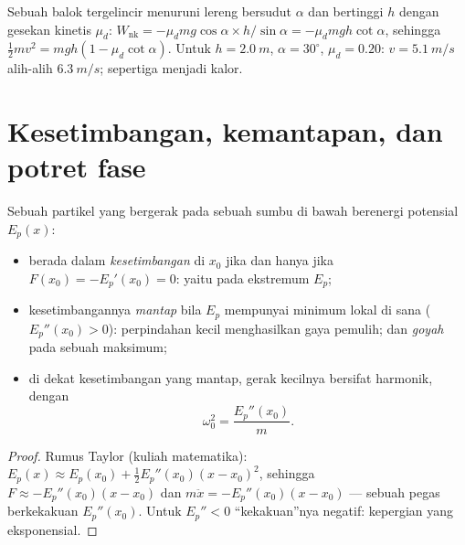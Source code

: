 \begin{example}\label{ex:b1:work-and-energy:friction}
Sebuah balok tergelincir menuruni lereng bersudut $\alpha$ dan
bertinggi $h$ dengan gesekan kinetis $\mu_d$: $W_{\text{nk}} = -\mu_dmg\cos\alpha \times
h/\sin\alpha = -\mu_dmgh\cot\alpha$, sehingga $\tfrac12 mv^2 = mgh(1 - \mu_d\cot\alpha)$.
Untuk $h = \qty{2.0}{m}$, $\alpha = 30^\circ$, $\mu_d = 0.20$: $v =
\qty{5.1}{m/s}$ alih-alih $\qty{6.3}{m/s}$; sepertiga  menjadi kalor.
\end{example}

\section{Kesetimbangan, kemantapan, dan potret fase}

\begin{proposition}\label{prop:b1:work-and-energy:stability}
Sebuah partikel yang bergerak pada sebuah sumbu di bawah  berenergi potensial $E_p(x)$:
\begin{itemize}
  \item berada dalam \emph{kesetimbangan} di $x_0$ jika dan hanya jika
        $F(x_0) = -E_p'(x_0) = 0$: yaitu pada ekstremum $E_p$;
  \item kesetimbangannya \emph{mantap} bila $E_p$ mempunyai minimum
        lokal di sana ($E_p''(x_0) > 0$): perpindahan kecil menghasilkan
        gaya pemulih; dan \emph{goyah} pada sebuah maksimum;
  \item di dekat kesetimbangan yang mantap, gerak kecilnya bersifat
        harmonik, dengan
        \[
        \omega_0^2 = \frac{E_p''(x_0)}{m} .
        \]
\end{itemize}
\end{proposition}

\begin{proof}
Rumus Taylor (kuliah matematika): $E_p(x) \approx E_p(x_0) +
\tfrac12 E_p''(x_0)(x - x_0)^2$, sehingga $F \approx -E_p''(x_0)(x - x_0)$ dan
$m\ddot x = -E_p''(x_0)(x - x_0)$ --- sebuah pegas berkekakuan $E_p''(x_0)$.
Untuk $E_p'' < 0$ ``kekakuan''nya negatif: kepergian yang eksponensial.
\end{proof}

